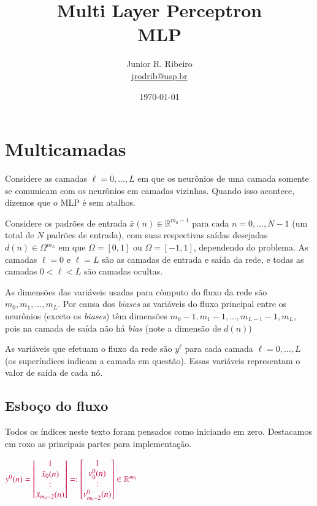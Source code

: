\documentclass[12pt,a4paper]{article}
\title{Multi Layer Perceptron\\MLP}
\author{Junior R. Ribeiro \\ \url{jrodrib@usp.br}}
\date{\today}
\def\RR{\mathbb{R}}
\begin{document}
\maketitle\tableofcontents

\section{Multicamadas}

Considere as camadas $\ell=0,...,L$ em que os neurônios de uma camada somente se comunicam com os neurônios em camadas vizinhas. Quando isso acontece, dizemos que o MLP é sem atalhos.

Considere os padrões de entrada $\bar x(n)\in\RR^{m_0-1}$ para cada $n=0,...,N-1$ (um total de $N$ padrões de entrada), com suas respectivas saídas desejadas $d(n)\in\Omega^{m_L}$ em que $\Omega=[0,1]$ ou $\Omega=[-1,1]$, dependendo do problema. As camadas $\ell=0$ e $\ell=L$ são as camadas de entrada e saída da rede, e todas as camadas $0<\ell<L$ são camadas ocultas.

As dimensões das variáveis usadas para cômputo do fluxo da rede são $m_0, m_1,...,m_L$. Por causa dos \textit{biases} as variáveis do fluxo principal entre os neurônios (exceto os \textit{biases}) têm dimensões $m_0-1, m_1-1,...,m_{L-1}-1,m_L$, pois na camada de saída não há \textit{bias} (note a dimensão de $d(n)$)

As variáveis que efetuam o fluxo da rede são $y^\ell$ para cada camada $\ell=0,...,L$ (os superíndices indicam a camada em questão). Essas variáveis representam o valor de saída de cada nó.

\subsection{Esboço do fluxo}
Todos os índices neste texto foram pensados como iniciando em zero. Destacamos em {\color{purple} roxo} as principais partes para implementação.

$\color{purple}
y^0(n) = \begin{bmatrix}
1\\
\bar x_0(n)\\
:\\
\bar x_{m_0-2}(n)
\end{bmatrix}
=:
\begin{bmatrix}
	1\\
	v_0^0(n)\\
	:\\
	v_{m_0-2}^0(n)
\end{bmatrix}
\in \RR^{m_0}
$
\end{document}

